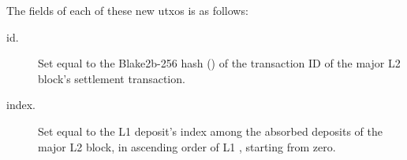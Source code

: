 \documentclass[../hydrozoa.tex]{subfiles}
\begin{document}
The  fields of each of these new utxos is as follows:
\begin{description}
  \item[id.] Set equal to the Blake2b-256 hash () of the transaction ID of the major L2 block's settlement transaction.
  \item[index.] Set equal to the L1 deposit's index among the absorbed deposits of the major L2 block, in ascending order of L1 , starting from zero.
\end{description}
\end{document}
